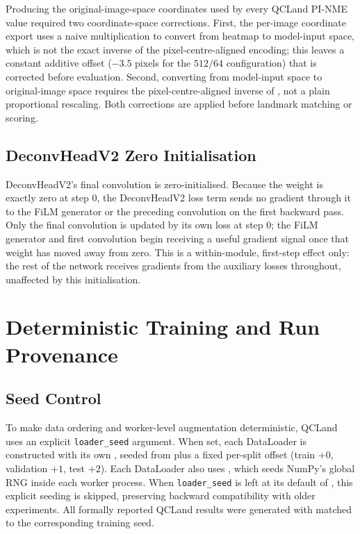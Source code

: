 Producing the original-image-space coordinates used by every QCLand
PI-NME value required two coordinate-space corrections. First, the
per-image coordinate export uses a naive multiplication to convert
from heatmap to model-input space, which is not the exact inverse of
the pixel-centre-aligned encoding; this leaves a constant additive
offset ($-3.5$ pixels for the $512/64$ configuration) that is
corrected before evaluation. Second, converting from model-input
space to original-image space requires the pixel-centre-aligned
inverse of , not a plain proportional rescaling.
Both corrections are applied before landmark matching or scoring.


\subsection{DeconvHeadV2 Zero Initialisation}
\label{app:deconvheadv2-init-gradient}

DeconvHeadV2's final convolution is zero-initialised. Because the
weight is exactly zero at step 0, the DeconvHeadV2 loss term sends
no gradient through it to the FiLM generator or the preceding
convolution on the first backward pass. Only the final convolution
is updated by its own loss at step 0; the FiLM generator and first
convolution begin receiving a useful gradient signal once that weight
has moved away from zero. This is a within-module, first-step effect
only: the rest of the network receives gradients from the auxiliary
losses throughout, unaffected by this initialisation.



\section{Deterministic Training and Run Provenance}
\label{app:seed-control}


\subsection{Seed Control}

To make data ordering and worker-level augmentation deterministic,
QCLand uses an explicit \texttt{loader\_seed} argument. When set,
each DataLoader is constructed with its own ,
seeded from  plus a fixed per-split offset
(train $+0$, validation $+1$, test $+2$). Each DataLoader also uses
, which seeds NumPy's global
RNG inside each worker process. When \texttt{loader\_seed} is left
at its default of , this explicit seeding is skipped,
preserving backward compatibility with older experiments. All
formally reported QCLand results were generated with
 matched to the corresponding training seed.

